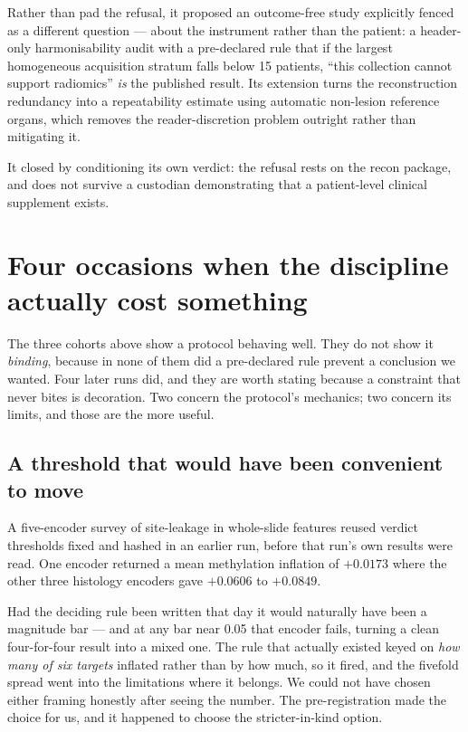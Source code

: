 \documentclass[11pt,a4paper]{article}
\begin{document}
Rather than pad the refusal, it proposed an outcome-free study explicitly fenced as a different
question --- about the instrument rather than the patient: a header-only harmonisability audit
with a pre-declared rule that if the largest homogeneous acquisition stratum falls below 15
patients, ``this collection cannot support radiomics'' \emph{is} the published result. Its
extension turns the reconstruction redundancy into a repeatability estimate using automatic
non-lesion reference organs, which removes the reader-discretion problem outright rather than
mitigating it.

It closed by conditioning its own verdict: the refusal rests on the recon package, and does not
survive a custodian demonstrating that a patient-level clinical supplement exists.

\section{Four occasions when the discipline actually cost something}

The three cohorts above show a protocol behaving well. They do not show it \emph{binding}, because in
none of them did a pre-declared rule prevent a conclusion we wanted. Four later runs did, and they
are worth stating because a constraint that never bites is decoration. Two concern the protocol's
mechanics; two concern its limits, and those are the more useful.

\subsection{A threshold that would have been convenient to move}

A five-encoder survey of site-leakage in whole-slide features reused verdict thresholds fixed and
hashed in an earlier run, before that run's own results were read. One encoder returned a mean
methylation inflation of $+0.0173$ where the other three histology encoders gave $+0.0606$ to
$+0.0849$.

Had the deciding rule been written that day it would naturally have been a magnitude bar --- and at
any bar near 0.05 that encoder fails, turning a clean four-for-four result into a mixed one. The rule
that actually existed keyed on \emph{how many of six targets} inflated rather than by how much, so it
fired, and the fivefold spread went into the limitations where it belongs. We could not have chosen
either framing honestly after seeing the number. The pre-registration made the choice for us, and it
happened to choose the stricter-in-kind option.
\end{document}

